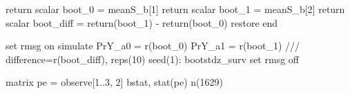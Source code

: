 \documentclass[
  10pt,
  a4paper,
]{book}
\newenvironment{Shaded}{\begin{snugshade}}{\end{snugshade}}
\newcommand{\CommentTok}[1]{\textcolor[rgb]{0.37,0.37,0.37}{#1}}
\newcommand{\DecValTok}[1]{\textcolor[rgb]{0.68,0.00,0.00}{#1}}
\newcommand{\FunctionTok}[1]{\textcolor[rgb]{0.28,0.35,0.67}{#1}}
\newcommand{\KeywordTok}[1]{\textcolor[rgb]{0.00,0.46,0.62}{#1}}
\newcommand{\NormalTok}[1]{\textcolor[rgb]{0.00,0.46,0.62}{#1}}
\begin{document}
\begin{Shaded}
\begin{Highlighting}[]
\FunctionTok{return} \FunctionTok{scalar}\NormalTok{ boot\_0 = meanS\_b[1]}
\FunctionTok{return} \FunctionTok{scalar}\NormalTok{ boot\_1 = meanS\_b[2]}
\FunctionTok{return} \FunctionTok{scalar}\NormalTok{ boot\_diff = }\FunctionTok{return}\NormalTok{(boot\_1) {-} }\FunctionTok{return}\NormalTok{(boot\_0)}
\KeywordTok{restore}
\KeywordTok{end}

\KeywordTok{set} \DecValTok{rmsg} \KeywordTok{on}
\KeywordTok{simulate}\NormalTok{ PrY\_a0 = }\FunctionTok{r}\NormalTok{(boot\_0) PrY\_a1 = }\FunctionTok{r}\NormalTok{(boot\_1) }\CommentTok{///}
\NormalTok{  difference=}\FunctionTok{r}\NormalTok{(boot\_diff), reps(10) }\DecValTok{seed}\NormalTok{(1): bootstdz\_surv}
\KeywordTok{set} \DecValTok{rmsg} \KeywordTok{off} 
 
\FunctionTok{matrix}\NormalTok{ pe = observe[1..3, 2]\textquotesingle{}}
\KeywordTok{bstat}\NormalTok{, stat(pe) n(1629)}
\end{Highlighting}
\end{Shaded}
\end{document}
